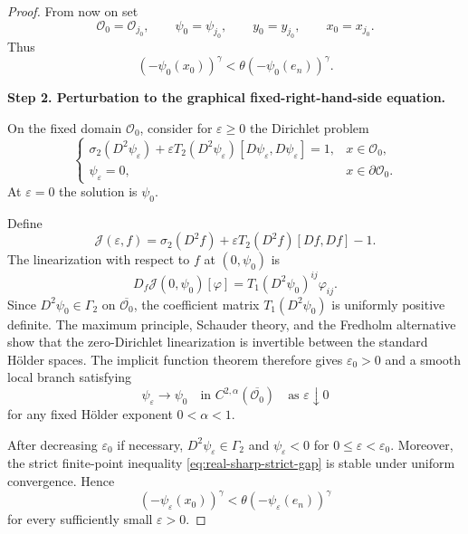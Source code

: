 \documentclass{article}
\numberwithin{equation}{section}
\begin{document}
\begin{proof}
From now on set
\[
\mathcal O_0=\mathcal O_{j_0},
\qquad
\psi_0=\psi_{j_0},
\qquad
y_0=y_{j_0},
\qquad
x_0=x_{j_0}.
\]
Thus
\begin{equation}
\label{eq:real-sharp-strict-gap}
(-\psi_0(x_0))^\gamma
<
\theta(-\psi_0(e_n))^\gamma.
\end{equation}

\medskip
\noindent\textbf{Step 2. Perturbation to the graphical
fixed-right-hand-side equation.}

On the fixed domain $\mathcal O_0$, consider for
$\varepsilon\ge0$ the Dirichlet problem
\begin{equation}
\label{eq:real-sharp-perturb}
\begin{cases}
\sigma_2(D^2\psi_\varepsilon)
+
\varepsilon
T_2(D^2\psi_\varepsilon)
[D\psi_\varepsilon,D\psi_\varepsilon]
=1,
& x\in\mathcal O_0,\\
\psi_\varepsilon=0,
& x\in\partial\mathcal O_0.
\end{cases}
\end{equation}
At $\varepsilon=0$ the solution is $\psi_0$.

Define
\[
\mathcal J(\varepsilon,f)
=
\sigma_2(D^2f)
+
\varepsilon T_2(D^2f)[Df,Df]
-1.
\]
The linearization with respect to $f$ at $(0,\psi_0)$ is
\[
D_f\mathcal J(0,\psi_0)[\varphi]
=
T_1(D^2\psi_0)^{ij}\varphi_{ij}.
\]
Since $D^2\psi_0\in\Gamma_2$ on
$\overline{\mathcal O_0}$, the coefficient matrix
$T_1(D^2\psi_0)$ is uniformly positive definite. The maximum
principle, Schauder theory, and the Fredholm alternative show that
the zero-Dirichlet linearization is invertible between the standard
Hölder spaces. The implicit function theorem therefore gives
$\varepsilon_0>0$ and a smooth local branch satisfying
\begin{equation}
\label{eq:real-sharp-IFT}
\psi_\varepsilon
\longrightarrow
\psi_0
\quad\text{in }C^{2,\alpha}(\overline{\mathcal O_0})
\quad\text{as }\varepsilon\downarrow0
\end{equation}
for any fixed Hölder exponent $0<\alpha<1$.

After decreasing $\varepsilon_0$ if necessary,
$D^2\psi_\varepsilon\in\Gamma_2$ and
$\psi_\varepsilon<0$ for $0\le\varepsilon<\varepsilon_0$.
Moreover, the strict finite-point inequality
\eqref{eq:real-sharp-strict-gap} is stable under uniform convergence.
Hence
\begin{equation}
\label{eq:real-sharp-gap-perturbed}
(-\psi_\varepsilon(x_0))^\gamma
<
\theta(-\psi_\varepsilon(e_n))^\gamma
\end{equation}
for every sufficiently small $\varepsilon>0$.


\end{proof}
\end{document}
